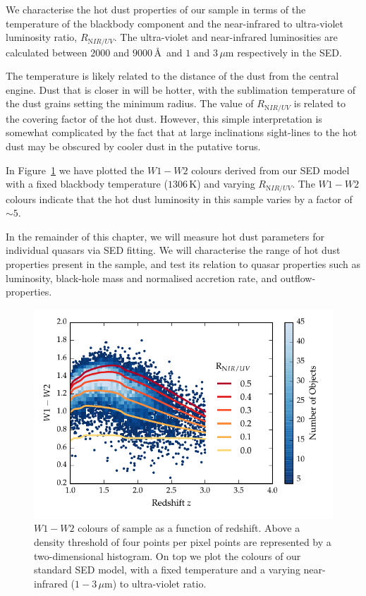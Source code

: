We characterise the hot dust properties of our sample in terms of the temperature of the blackbody component and the near-infrared to ultra-violet luminosity ratio, $R_{\mathrm NIR/UV}$. 
The ultra-violet and near-infrared luminosities are calculated between $2000$ and $9000$\,\AA\, and $1$ and $3$\,$\mu$m respectively in the SED.

The temperature is likely related to the distance of the dust from the central engine.
Dust that is closer in will be hotter, with the sublimation temperature of the dust grains setting the minimum radius.  
The value of $R_{\mathrm NIR/UV}$ is related to the covering factor of the hot dust. 
However, this simple interpretation is somewhat complicated by the fact that at large inclinations sight-lines to the hot dust may be obscured by cooler dust in the putative torus. 

In Figure~\ref{fig:w1w2colorsratio} we have plotted the $W1-W2$ colours derived from our SED model with a fixed blackbody temperature ($1306$\,K) and varying $R_{\mathrm NIR/UV}$.
The $W1-W2$ colours indicate that the hot dust luminosity in this sample varies by a factor of $\sim5$. 

In the remainder of this chapter, we will measure hot dust parameters for individual quasars via SED fitting. 
We will characterise the range of hot dust properties present in the sample, and test its relation to quasar properties such as luminosity, black-hole mass and normalised accretion rate, and outflow-properties. 

\begin{figure}[t!]
\centering
\includegraphics[width=\columnwidth]{figures/chapter05/w1w2_versus_redshift_ratio.pdf}
\caption[{$W1 - W2$ colours of sample as a function of redshift.}]{$W1 - W2$ colours of sample as a function of redshift. Above a density threshold of four points per pixel points are represented by a two-dimensional histogram. On top we plot the colours of our standard SED model, with a fixed temperature and a varying near-infrared ($1 - 3$\,$\mu$m) to ultra-violet ratio.}
  \label{fig:w1w2colorsratio}
\end{figure}

